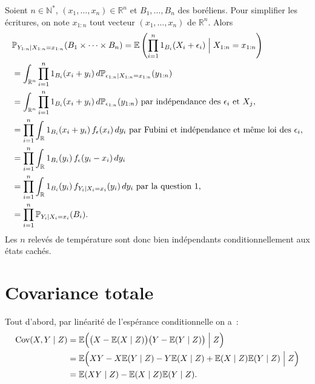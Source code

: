 \label{III-answer-ec2}
Soient \(n\in\mathbb{N}^\ast\), \((x_1,\dots,x_n)\in\mathbb{R}^n\) et
\(B_1,\dots,B_n\) des boréliens. Pour simplifier les écritures, on note
\(x_{1:n}\) tout vecteur \((x_1,\dots,x_n)\) de \(\mathbb{R}^n\). Alors
\begin{align*}
&\mathbb{P}_{Y_{1:n}\mid X_{1:n}=x_{1:n}}(B_1\times\dots\times B_n)
=\mathbb{E}\left(\prod_{i = 1}^n 1_{B_i}(X_i + \epsilon_i) \Bigm\vert X_{1:n} = x_{1:n} \right)\\
&= \int_{\mathbb{R}^n} \prod_{i = 1}^n 1_{B_i}(x_i + y_i)\,d\mathbb{P}_{\epsilon_{1:n}\mid X_{1:n} = x_{1:n}}(y_{1:n})\\
&= \int_{\mathbb{R}^n} \prod_{i = 1}^n 1_{B_i}(x_i + y_i)\,d\mathbb{P}_{\epsilon_{1:n}}(y_{1:n}) \ \text{par indépendance des $\epsilon_i$ et $X_j$,}\\
&= \prod_{i = 1}^n \int_{\mathbb{R}} 1_{B_i}(x_i + y_i)\,f_\epsilon(x_i)\,dy_{i} \ \text{par Fubini et indépendance et même loi des $\epsilon_i$,}\\
&= \prod_{i = 1}^n \int_{\mathbb{R}} 1_{B_i}(y_i)\,f_\epsilon(y_i - x_i)\,dy_i\\
& = \prod_{i = 1}^n \int_{\mathbb{R}} 1_{B_i}(y_i)\,f_{Y_i\mid X_i = x_i}(y_i)\,dy_i\ \text{par la question 1,}\\
&= \prod_{i = 1}^n \mathbb{P}_{Y_i\mid X_i = x_i}(B_i).
\end{align*} Les \(n\) relevés de température sont donc bien
indépendants conditionnellement aux états cachés.

\section{Covariance totale}\label{III-answer-covtot}

Tout d'abord, par linéarité de l'espérance conditionnelle on a~:
\begin{align*}
\text{Cov}(X,Y \mid Z) &= \mathbb{E}\Bigl( \bigl( X - \mathbb{E}(X\mid Z) \bigr)\bigl( Y - \mathbb{E}(Y\mid Z) \bigr) \Bigm| Z  \Bigr)\\
&= \mathbb{E}\Bigl( XY - X\mathbb{E}(Y\mid Z) - Y\mathbb{E}(X\mid Z) + \mathbb{E}(X\mid Z)\mathbb{E}(Y\mid Z) \Bigm| Z  \Bigr)\\
&= \mathbb{E}(XY \mid Z) - \mathbb{E}(X\mid Z)\mathbb{E}(Y\mid Z).
\end{align*}

